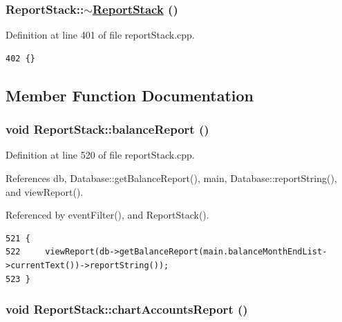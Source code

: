 \hypertarget{classReportStack_a1}{
\subsubsection[$\sim$ReportStack]{\setlength{\rightskip}{0pt plus 5cm}Report\-Stack::$\sim$\hyperlink{classReportStack}{Report\-Stack} ()}}
\label{classReportStack_a1}


Definition at line 401 of file report\-Stack.cpp.

\footnotesize\begin{verbatim}402 {}
\end{verbatim}\normalsize 




\subsection{Member Function Documentation}
\hypertarget{classReportStack_k11}{
\subsubsection[balanceReport]{\setlength{\rightskip}{0pt plus 5cm}void Report\-Stack::balance\-Report ()}}
\label{classReportStack_k11}


Definition at line 520 of file report\-Stack.cpp.

References db, Database::get\-Balance\-Report(), main, Database::report\-String(), and view\-Report().

Referenced by event\-Filter(), and Report\-Stack().

\footnotesize\begin{verbatim}521 {
522     viewReport(db->getBalanceReport(main.balanceMonthEndList->currentText())->reportString());
523 }
\end{verbatim}\normalsize 


\hypertarget{classReportStack_k10}{
\subsubsection[chartAccountsReport]{\setlength{\rightskip}{0pt plus 5cm}void Report\-Stack::chart\-Accounts\-Report ()}}
\label{classReportStack_k10}


